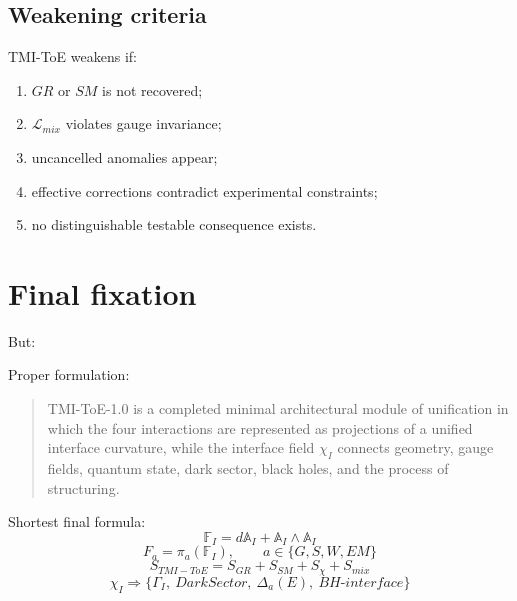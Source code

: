 \documentclass[12pt,a4paper]{article}
\begin{document}
\subsection{Weakening criteria}

TMI-ToE weakens if:
\begin{enumerate}
  \item $GR$ or $SM$ is not recovered;
  \item $\mathcal L_{mix}$ violates gauge invariance;
  \item uncancelled anomalies appear;
  \item effective corrections contradict experimental constraints;
  \item no distinguishable testable consequence exists.
\end{enumerate}

\section{Final fixation}

\begin{center}
\end{center}

But:
\begin{center}
\end{center}

Proper formulation:
\begin{quote}
TMI-ToE-1.0 is a completed minimal architectural module of unification in which the four interactions are represented as projections of a unified interface curvature, while the interface field $\chi_I$ connects geometry, gauge fields, quantum state, dark sector, black holes, and the process of structuring.
\end{quote}

Shortest final formula:
\[
\boxed{\mathbb F_I=d\mathbb A_I+\mathbb A_I\wedge\mathbb A_I}
\]
\[
\boxed{F_a=\pi_a(\mathbb F_I),\qquad a\in\{G,S,W,EM\}}
\]
\[
\boxed{S_{TMI-ToE}=S_{GR}+S_{SM}+S_\chi+S_{mix}}
\]
\[
\boxed{\chi_I\Rightarrow\{\Gamma_I,\ DarkSector,\ \Delta_a(E),\ BH\mbox{-}interface\}}
\]
\end{document}
